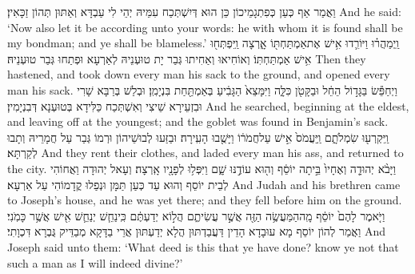 {וַאֲמַר אַף כְּעַן כְּפִתְגָמֵיכוֹן כֵּן הוּא דְּיִשְׁתְּכַח עִמֵּיהּ יְהֵי לִי עַבְדָּא וְאַתּוּן תְּהוֹן זַכָּאִין׃}
{And he said: ‘Now also let it be according unto your words: he with whom it is found shall be my bondman; and ye shall be blameless.’}{}
{וַֽיְמַהֲר֗וּ וַיּוֹרִ֛דוּ אִ֥ישׁ אֶת\maqqaf אַמְתַּחְתּ֖וֹ אָ֑רְצָה וַֽיִּפְתְּח֖וּ אִ֥ישׁ אַמְתַּחְתּֽוֹ׃}
{וְאוֹחִיאוּ וְאַחִיתוּ גְּבַר יָת טוּעְנֵיהּ לְאַרְעָא וּפְתַחוּ גְּבַר טוּעְנֵיהּ׃}
{Then they hastened, and took down every man his sack to the ground, and opened every man his sack.}{}
{וַיְחַפֵּ֕שׂ בַּגָּד֣וֹל הֵחֵ֔ל וּבַקָּטֹ֖ן כִּלָּ֑ה וַיִּמָּצֵא֙ הַגָּבִ֔יעַ בְּאַמְתַּ֖חַת בִּנְיָמִֽן׃}
{וּבְלַשׁ בְּרַבָּא שָׁרִי וּבִזְעֵירָא שֵׁיצִי וְאִשְׁתְּכַח כַּלִּידָא בְּטוּעְנָא דְּבִנְיָמִין׃}
{And he searched, beginning at the eldest, and leaving off at the youngest; and the goblet was found in Benjamin’s sack.}{}
{וַֽיִּקְרְע֖וּ שִׂמְלֹתָ֑ם וַֽיַּעֲמֹס֙ אִ֣ישׁ עַל\maqqaf חֲמֹר֔וֹ וַיָּשֻׁ֖בוּ הָעִֽירָה׃}
{וּבַזַּעוּ לְבוּשֵׁיהוֹן וּרְמוֹ גְּבַר עַל חֲמָרֵיהּ וְתָבוּ לְקַרְתָּא׃}
{And they rent their clothes, and laded every man his ass, and returned to the city.}{}
{וַיָּבֹ֨א יְהוּדָ֤ה וְאֶחָיו֙ בֵּ֣יתָה יוֹסֵ֔ף וְה֖וּא עוֹדֶ֣נּוּ שָׁ֑ם וַיִּפְּל֥וּ לְפָנָ֖יו אָֽרְצָה׃}
{וְעָאל יְהוּדָה וַאֲחוֹהִי לְבֵית יוֹסֵף וְהוּא עַד כְּעַן תַּמָּן וּנְפַלוּ קֳדָמוֹהִי עַל אַרְעָא׃}
{And Judah and his brethren came to Joseph’s house, and he was yet there; and they fell before him on the ground.}{}
{וַיֹּ֤אמֶר לָהֶם֙ יוֹסֵ֔ף מָֽה\maqqaf הַמַּעֲשֶׂ֥ה הַזֶּ֖ה אֲשֶׁ֣ר עֲשִׂיתֶ֑ם הֲל֣וֹא יְדַעְתֶּ֔ם כִּֽי\maqqaf נַחֵ֧שׁ יְנַחֵ֛שׁ אִ֖ישׁ אֲשֶׁ֥ר כָּמֹֽנִי׃}
{וַאֲמַר לְהוֹן יוֹסֵף מָא עוּבָדָא הָדֵין דַּעֲבַדְתּוּן הֲלָא יְדַעְתּוּן אֲרֵי בַדָּקָא מְבַדֵּיק גֻּבְרָא דִּכְוָתִי׃}
{And Joseph said unto them: ‘What deed is this that ye have done? know ye not that such a man as I will indeed divine?’}{}
